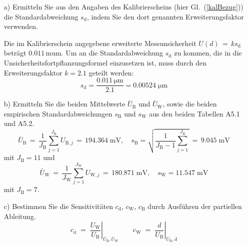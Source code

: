\begin{itemize}
\item[a)] Ermitteln Sie aus den Angaben des Kalibrierscheins (hier Gl.~(\ref{kalBezug}))
die Standardabweichung $s_\mathrm{d}$, indem Sie den dort genannten Erweiterungsfaktor verwenden.

Die im Kalibrierschein angegebene erweiterte Messunsicherheit $U(d)\, = \, k s_\mathrm{d}$
beträgt $0.011 \, \mathrm{mu m}$. Um an die Standardabweichung $s_\mathrm{d}$ zu kommen,
die in die Unsicherheitsfortpflanzungsformel einzusetzen ist,
muss durch den Erweiterungsfaktor $k = 2.1$ geteilt werden:
$$
s_\mathrm{d} = \frac{0.011 \, \mathrm{\mu m}}{2.1} = 0.00524 \; \mathrm{\mu m}
$$
\item[b)] Ermitteln Sie die beiden Mittelwerte $\bar U_\mathrm{B}$ und $\bar U_\mathrm{W}$,
sowie die beiden empirischen Standardabweichungen $s_\mathrm{B}$ und $s_\mathrm{W}$
aus den beiden Tabellen A5.1 und A5.2.
$$
\bar U_\mathrm{B} \, = \, \frac{1}{J_\mathrm{B}}\sum\limits_{j=1}^{J_\mathrm{B}}  U_{\mathrm{B},j}
\, = \, 194.364 \; \mathrm{mV},
\quad
 s_\mathrm{B}  = \sqrt{\frac{1}{J_\mathrm{B}-1}\sum\limits_{j=1}^{J_\mathrm{B}}} \, = \,
 9.045 \; \mathrm{mV}
$$
mit $J_\mathrm{B} = 11$ und
$$
\bar U_\mathrm{W} \, =  \, \frac{1}{J_\mathrm{W}}\sum\limits_{j=1}^{J_\mathrm{W}}  U_{\mathrm{W},j}
\, = \, 180.871 \; \mathrm{mV}, \quad s_\mathrm{W}  =  11.547 \; \mathrm{mV}
$$
mit $J_\mathrm{B} = 7$.

\item[c)] Bestimmen Sie die Sensitivitäten $c_\mathrm{d}$, $c_\mathrm{W}$, $c_\mathrm{B}$ durch Ausführen der
partiellen Ableitung.
\begin{equation}
c_\mathrm{d} \; = \; \left. \frac{U_\mathrm{W}}{U_\mathrm{B}} \right|_{\bar U_\mathrm{B}, \bar U_\mathrm{W}} \qquad
c_\mathrm{W} \; = \; \left. \frac{d}{U_\mathrm{B}} \right|_{\bar U_\mathrm{B}, \bar d}
\label{AufgPartiellLinear}
\end{equation}


\end{itemize}
